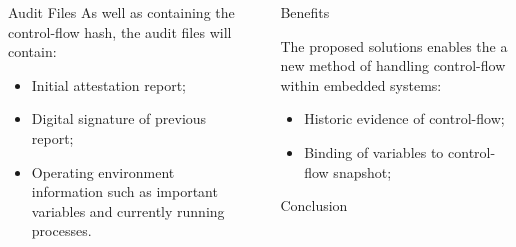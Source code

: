 \documentclass[final]{beamer}
\newlength{\sepwid}
\newlength{\onecolwid}
\newlength{\twocolwid}
\begin{document}
\begin{frame}[t]
\begin{columns}[t]
\begin{column}{\twocolwid}
\begin{columns}[t,totalwidth=\twocolwid]
\begin{column}{\onecolwid}
\begin{block}{Audit Files}
As well as containing the control-flow hash, the audit files will contain:
\begin{itemize}
	\item Initial attestation report; \vspace*{0.3cm}
	\item Digital signature of previous report; \vspace*{0.3cm}
	\item Operating environment information such as important variables and currently running processes.
\end{itemize}

\end{block}

\end{column} %

\end{columns} %

\end{column} %


\begin{column}{\sepwid}\end{column} %

\begin{column}{\onecolwid} %

\begin{alertblock}{Benefits}

The proposed solutions enables the a new method of handling control-flow within embedded systems:
\begin{itemize}
\item Historic evidence of control-flow;
\item Binding of variables to control-flow snapshot;
\end{itemize}

\end{alertblock}

\vspace*{1cm}
\begin{block}{Conclusion}


\end{block}
\end{column}
\end{columns}
\end{frame}
\end{document}
